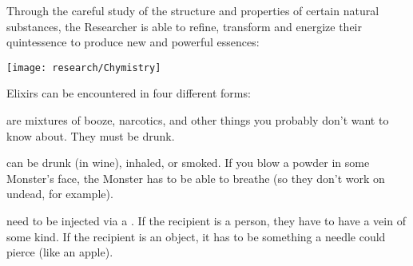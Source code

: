 



Through the careful study of the structure and properties of certain natural substances, the Researcher is able to refine, transform and energize their quintessence to produce new and powerful essences:



\begin{center}
  \texttt{[image: research/Chymistry]}
\end{center}


\cbreak


Elixirs can be encountered in four different forms:

  are mixtures of booze, narcotics, and other things you probably don't want to know about. They must be drunk.

 can be drunk (in wine), inhaled, or smoked.  If you blow a powder in some Monster’s face, the Monster has to be able to breathe (so they don't work on undead, for example).

 need to be injected via a .  If the recipient is a person, they have to have a vein of some kind.  If the recipient is an object, it has to be something a needle could pierce (like an apple).

